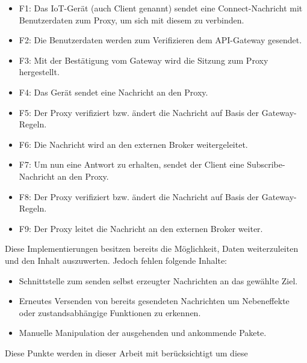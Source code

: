         \begin{itemize}
            \item F1: Das \ac{IoT}-Gerät (auch \glqq Client\grqq{} genannt) sendet eine \glqq Connect-Nachricht\grqq{} mit Benutzerdaten zum Proxy, um sich mit diesem zu verbinden.
            \item F2: Die Benutzerdaten werden zum Verifizieren dem API-Gateway gesendet.
            \item F3: Mit der Bestätigung vom Gateway wird die Sitzung zum Proxy hergestellt.
            \item F4: Das Gerät sendet eine Nachricht an den Proxy.
            \item F5: Der Proxy verifiziert bzw. ändert die Nachricht auf Basis der Gateway-Regeln.
            \item F6: Die Nachricht wird an den externen Broker weitergeleitet.
            \item F7: Um nun eine Antwort zu erhalten, sendet der Client eine \glqq Subscribe-Nachricht\grqq{} an den Proxy.
            \item F8: Der Proxy verifiziert bzw. ändert die Nachricht auf Basis der Gateway-Regeln.
            \item F9: Der Proxy leitet die Nachricht an den externen Broker weiter.
        \end{itemize}
    Diese Implementierungen besitzen bereits die Möglichkeit, Daten weiterzuleiten und den Inhalt auszuwerten. Jedoch fehlen folgende Inhalte:
    \begin{itemize}
        \item Schnittstelle zum senden selbst erzeugter Nachrichten an das gewählte Ziel.
        \item Erneutes Versenden von bereits gesendeten Nachrichten um Nebeneffekte oder zustandsabhängige Funktionen zu erkennen.
        \item Manuelle Manipulation der ausgehenden und ankommende Pakete.
    \end{itemize}
    
    Diese Punkte werden in dieser Arbeit mit berücksichtigt um diese 

